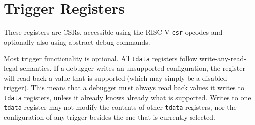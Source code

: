 \section{Trigger Registers}

These registers are CSRs, accessible using the RISC-V {\tt csr} opcodes and
optionally also using abstract debug commands.

Most trigger functionality is optional. All {\tt tdata} registers follow
write-any-read-legal semantics. If a debugger writes an unsupported
configuration, the register will read back a value that is supported (which may
simply be a disabled trigger).  This means that a debugger must always read
back values it writes to {\tt tdata} registers, unless it already knows already
what is
supported.  Writes to one {\tt tdata} register may not modify the contents of
other {\tt tdata} registers, nor the configuration of any trigger besides the
one that is currently selected.



